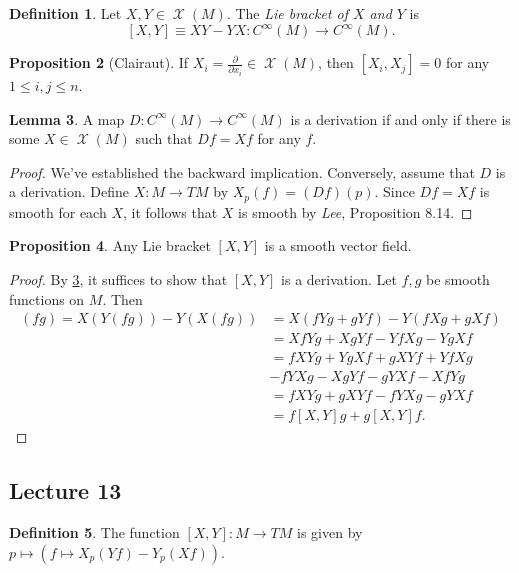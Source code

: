 \documentclass[10pt,letterpaper,cm]{nupset}
\theoremstyle{definition}
\newtheorem{definition}{Definition}[subsection]
\theoremstyle{theorem}
\newtheorem{lemma}[definition]{Lemma}
\newtheorem{prop}[definition]{Proposition}
\theoremstyle{remark}
\newcommand{\1}{\mathbf{1}}
\newcommand{\0}{\vec 0}
\DeclareMathOperator{\vf}{\mathscr{X}}
\begin{document}
\begin{definition}
Let $X, Y \in \vf(M)$. The \textit{Lie bracket of $X$ and $Y$} is $$[X, Y] \equiv  XY - YX : C^{\infty}(M)\to C^{\infty}(M).$$
\end{definition}

\begin{prop}[Clairaut]
If $X_i = \frac{\partial}{\partial{x_i}}\in \vf(M)$, then $[X_i, X_j] = 0$ for any $1\leq i,j \leq n$.
\end{prop}

\begin{lemma}\label{deriv}
A map $D: C^{\infty}(M) \to C^{\infty}(M)$ is a derivation if and only if there is some $X \in \vf(M)$ such that $Df = Xf$ for any $f$.
\end{lemma}
\begin{proof}
We've established the backward implication. Conversely, assume that $D$ is a derivation. Define $X : M \to TM$ by $X_p(f) = (Df)(p)$. Since $Df = Xf$ is smooth for each $X$, it follows that $X$ is smooth by \textit{Lee}, Proposition 8.14.
\end{proof}

\begin{prop}
Any Lie bracket $[X, Y]$ is a smooth vector field.
\end{prop}
\begin{proof}
By \cref{deriv}, it suffices to show that $[X, Y]$ is a derivation. Let $f, g$ be smooth functions on $M$. Then
\begin{align*}
 [X, Y](fg) = X(Y(fg)) - Y(X(fg)) & =  X(fYg + gYf) - Y(fXg + gXf) 
 \\ & = XfYg + XgYf - YfXg - YgXf 
 \\ & = fXYg + YgXf + gXYf + YfXg 
 \\ & - fYXg - XgYf - gYXf - XfYg 
 \\ & = fXYg + gXYf - fYXg - gYXf 
 \\ & = f[X,Y]g + g[X,Y]f
.\end{align*}
\end{proof}

\subsection{Lecture 13}

\begin{definition}
The function $[X, Y] : M \to TM$ is given by $p\mapsto \left(f \mapsto X_p(Yf) - Y_p(Xf)\right)$.
\end{definition}
\end{document}
